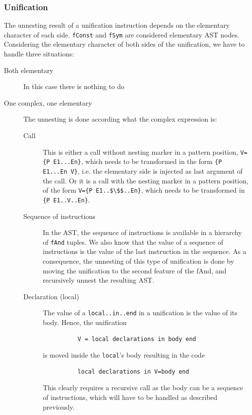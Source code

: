 \documentclass[a4paper]{memoir}
\begin{document}
\subsubsection{Unification}\label{sec:arch:unnester:unification}
The unnesting result of a unification instruction depends on the elementary
character of each side. \lstinline!fConst! and \lstinline!fSym! are considered elementary AST nodes.
Considering the elementary character of both sides of the unification, we have to handle three situations:
\begin{description}
  \item[Both elementary]In this case there is nothing to do
  \item[One complex, one elementary] The unnesting is done according what the
    complex expression is: 
    \begin{description}
      \item[Call] This is either a call without nesting marker in a pattern position, \lstinline!V={P E1...En}!,
        which needs to be transformed in the form \lstinline!{P E1...En V}!, i.e. the elementary side is injected as last argument of the call.
        Or it is a call with the nesting marker in a pattern position, of the form \lstinline[mathescape]!V={P E1..$\$$..En}!, which needs to be
        transformed in \lstinline!{P E1..V..En}!.
      \item[Sequence of instructions] In the AST, the sequence of instructions is available in a hierarchy of \lstinline!fAnd! tuples. We also know that the value of a sequence of instructions is the value of the last instruction in the sequence. As a consequence, the unnesting of this type of unification is done by moving the unification to the second feature of the fAnd, and recursively unnest the resulting AST.
      \item[Declaration (local)] The value of a \lstinline!local..in..end! in a
        unification is the value of its body. Hence, the unification
        \begin{lstlisting}
          V = local declarations in body end
        \end{lstlisting}
        is moved inside the
        \lstinline!local!'s body resulting in the code 
        \begin{lstlisting}
          local declarations in V=body end
        \end{lstlisting}
        This clearly requires a recursive call as the body can be a sequence of instructions, which will have to be handled as described previously.

\end{description}
\end{description}
\end{document}
